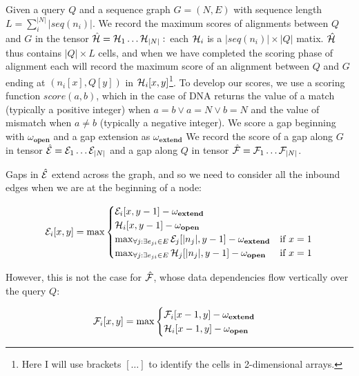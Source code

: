 Given a query $Q$ and a sequence graph $G = (N, E)$ with sequence length $L=\sum_{i}^{|N|} |seq(n_i)|$.
We record the maximum scores of alignments between $Q$ and $G$ in the tensor $\hat{\cal H} = {\cal H}_1 \ldots {\cal H}_{|N|} :$ each ${\cal H}_i$ is a $|seq(n_i)| \times |Q|$ matix.
$\hat{\cal H}$ thus contains $|Q|\times L$ cells, and when we have completed the scoring phase of alignment each will record the maximum score of an alignment between $Q$ and $G$ ending at $(n_i[x], Q[y])$ in ${\cal H}_{i}[x,y]$\footnote{Here I will use brackets $[\ldots]$ to identify the cells in 2-dimensional arrays.}.
To develop our scores, we use a scoring function $score(a, b)$, which in the case of DNA returns the value of a match (typically a positive integer) when $a = b \lor a = N \lor b = N$ and the value of mismatch when $a \neq b$ (typically a negative integer).
We score a gap beginning with $\omega_\textbf{open}$ and a gap extension as $\omega_\textbf{extend}$
We record the score of a gap along $G$ in tensor $\hat{\cal E} = {\cal E}_1 \ldots {\cal E}_{|N|}$ and a gap along $Q$ in tensor $\hat{\cal F} = {\cal F}_1 \ldots {\cal F}_{|N|}$.

Gaps in $\hat{\cal E}$ extend across the graph, and so we need to consider all the inbound edges when we are at the beginning of a node:

\begin{equation}
  {\cal E}_i[x,y] = \max
  \begin{cases}
    {\cal E}_i[x,y-1] - \omega_\textbf{extend} \\
    {\cal H}_i[x,y-1] - \omega_\textbf{open} \\
    \max_{\forall j : \exists e_{ji} \in E} {\cal E}_j[|n_j|,y-1] - \omega_\textbf{extend} & \text{if } x = 1 \\
    \max_{\forall j : \exists e_{ji} \in E} {\cal H}_j[|n_j|,y-1] - \omega_\textbf{open} & \text{if } x = 1 \\
  \end{cases}
\end{equation}

However, this is not the case for $\hat{\cal F}$, whose data dependencies flow vertically over the query $Q$:

\begin{equation}
  {\cal F}_i[x,y] = \max
  \begin{cases}
    {\cal F}_i[x-1,y] - \omega_\textbf{extend} \\
    {\cal H}_i[x-1,y] - \omega_\textbf{open} \\
  \end{cases}
\end{equation}


